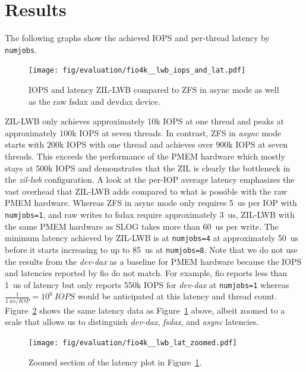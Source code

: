 \documentclass[12pt,a4paper,twoside]{book}
\begin{document}
\section{Results}\label{ch:lwb_analysis:results}

The following graphs show the achieved IOPS and per-thread latency by \lstinline{numjobs}.

\begin{figure}[H]
    \centering
    \texttt{[image: fig/evaluation/fio4k\_\_lwb\_iops\_and\_lat.pdf]}
    \caption{IOPS and latency ZIL-LWB compared to ZFS in async mode as well as the raw fsdax and devdax device.}
    \label{fig:lwbanalysis:iops_and_latency}
\end{figure}

ZIL-LWB only achieves approximately 10k IOPS at one thread and peaks at approximately 100k IOPS at seven threads.
In contrast, ZFS in \textit{async} mode starts with 200k IOPS with one thread and achieves over 900k IOPS at seven threads.
This exceeds the performance of the PMEM hardware which mostly stays at 500k IOPS and demonstrates that the ZIL is clearly the bottleneck in the \textit{zil-lwb} configuration.
A look at the per-IOP average latency emphasizes the vast overhead that ZIL-LWB adds compared to what is possible with the raw PMEM hardware.
Whereas ZFS in async mode only requires 5~us per IOP with \lstinline{numjobs=1}, and raw writes to fsdax require approximately 3~us, ZIL-LWB with the same PMEM hardware as SLOG takes more than 60~us per write.
The minimum latency achieved by ZIL-LWB is at \lstinline{numjobs=4} at approximately 50~us before it starts increasing to up to 85~us at \lstinline{numjobs=8}.
Note that we do not use the results from the \textit{dev-dax} as a baseline for PMEM hardware because the IOPS and latencies reported by fio do not match.
For example, fio reports less than 1~us of latency but only reports 550k IOPS for \textit{dev-dax} at \lstinline{numjobs=1} whereas $\frac{1}{1~us/IOP} = 10^6~\si{IOPS}$ would be anticipated at this latency and thread count.
Figure~\ref{fig:lwbanalysis:zoomed_latency} shows the same latency data as Figure~\ref{fig:lwbanalysis:iops_and_latency} above, albeit zoomed to a scale that allows us to distinguish \textit{dev-dax}, \textit{fsdax}, and \textit{async} latencies.

\begin{figure}[H]
    \centering
    \texttt{[image: fig/evaluation/fio4k\_\_lwb\_lat\_zoomed.pdf]}
    \caption{Zoomed section of the latency plot in Figure~\ref{fig:lwbanalysis:iops_and_latency}.}
    \label{fig:lwbanalysis:zoomed_latency}
\end{figure}
\end{document}
